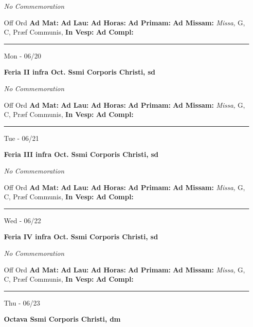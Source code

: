\documentclass[letterpaper, 10pt]{article}
\begin{document}
\textit{No Commemoration}\begin{justify}
Off Ord
\textbf{Ad Mat: }
\textbf{Ad Lau: }
\textbf{Ad Horas: }
\textbf{Ad Primam: }
\textbf{Ad Missam:} \textit{Missa, } G, C, Præf Communis, 
\textbf{In Vesp: }
\textbf{Ad Compl: }\end{justify}



\hrule
\begin{center}
Mon - 06/20
\end{center}\textbf{ \large Feria II infra Oct. Ssmi Corporis Christi, \textnormal{\normalsize sd}}

\textit{No Commemoration}\begin{justify}
Off Ord
\textbf{Ad Mat: }
\textbf{Ad Lau: }
\textbf{Ad Horas: }
\textbf{Ad Primam: }
\textbf{Ad Missam:} \textit{Missa, } G, C, Præf Communis, 
\textbf{In Vesp: }
\textbf{Ad Compl: }\end{justify}



\hrule
\begin{center}
Tue - 06/21
\end{center}\textbf{ \large Feria III infra Oct. Ssmi Corporis Christi, \textnormal{\normalsize sd}}

\textit{No Commemoration}\begin{justify}
Off Ord
\textbf{Ad Mat: }
\textbf{Ad Lau: }
\textbf{Ad Horas: }
\textbf{Ad Primam: }
\textbf{Ad Missam:} \textit{Missa, } G, C, Præf Communis, 
\textbf{In Vesp: }
\textbf{Ad Compl: }\end{justify}



\hrule
\begin{center}
Wed - 06/22
\end{center}\textbf{ \large Feria IV infra Oct. Ssmi Corporis Christi, \textnormal{\normalsize sd}}

\textit{No Commemoration}\begin{justify}
Off Ord
\textbf{Ad Mat: }
\textbf{Ad Lau: }
\textbf{Ad Horas: }
\textbf{Ad Primam: }
\textbf{Ad Missam:} \textit{Missa, } G, C, Præf Communis, 
\textbf{In Vesp: }
\textbf{Ad Compl: }\end{justify}



\hrule
\begin{center}
Thu - 06/23
\end{center}\textbf{ \large Octava Ssmi Corporis Christi, \textnormal{\normalsize dm}}
\end{document}
